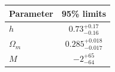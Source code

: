 \begin{tabular} { l  c}

 Parameter &  95\% limits\\
\hline
{\boldmath$h              $} & $0.73^{+0.17}_{-0.16}      $\\

{\boldmath$\Omega_m       $} & $0.285^{+0.018}_{-0.017}   $\\

{\boldmath$M              $} & $-2^{+65}_{-64}            $\\
\hline
\end{tabular}